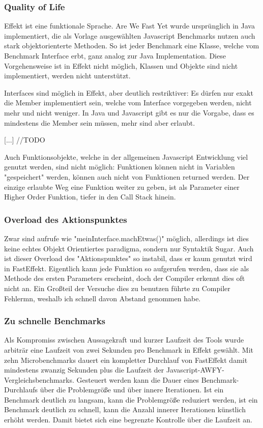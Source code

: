 
\subsubsection{ Quality of Life }
Effekt ist eine funktionale Sprache. Are We Fast Yet wurde ursprünglich in Java implementiert, die als Vorlage ausgewählten Javascript Benchmarks nutzen auch stark objektorienterte Methoden.
So ist jeder Benchmark eine Klasse, welche vom Benchmark Interface erbt, ganz analog zur Java Implementation.
Diese Vorgehensweise ist in Effekt nicht möglich, Klassen und Objekte sind nicht implementiert, werden nicht unterstützt.

Interfaces sind möglich in Effekt, aber deutlich restriktiver: Es dürfen nur exakt die Member implementiert sein, welche vom Interface vorgegeben werden, nicht mehr und nicht weniger.
In Java und Javascript gibt es nur die Vorgabe, dass es mindestens die Member sein müssen, mehr sind aber erlaubt.

[...] //TODO


Auch Funktionsobjekte, welche in der allgemeinen Javascript Entwicklung viel genutzt werden, sind nicht möglich: Funktionen können nicht in Variablen "gespeichert" werden, können auch nicht von Funktionen returned werden.
Der einzige erlaubte Weg eine Funktion weiter zu geben, ist als Parameter einer Higher Order Funktion, tiefer in den Call Stack hinein.

\subsubsection{ Overload des Aktionspunktes }
Zwar sind aufrufe wie "meinInterface.machEtwas()" möglich, allerdings ist dies keine echtes Objekt Orientiertes paradigma, sondern nur Syntaktik Sugar.
Auch ist dieser Overload des "Aktionspunktes" so instabil, dass er kaum genutzt wird in FastEffekt. Eigentlich kann jede Funktion so aufgerufen werden, dass sie als Methode des ersten Parameters erscheint, 
doch der Compiler erkennt dies oft nicht an. Ein Großteil der Versuche dies zu benutzen führte zu Compiler Fehlermn, weshalb ich schnell davon Abstand genommen habe.

\subsubsection{ Zu schnelle Benchmarks }
Als Kompromiss zwischen Aussagekraft und kurzer Laufzeit des Tools wurde arbiträr eine Laufzeit von zwei Sekunden pro Benchmark in Effekt gewählt.
Mit zehn Microbenchmarks dauert ein kompletter Durchlauf von FastEffekt damit mindestens zwanzig Sekunden plus die Laufzeit der Javascript-AWFY-Vergleichsbenchmarks.
Gesteuert werden kann die Dauer eines Benchmark-Durchlaufs über die Problemgröße und über innere Iterationen. Ist ein Benchmark deutlich zu langsam, kann die Problemgröße reduziert werden, ist ein Benchmark deutlich zu schnell, kann die Anzahl innerer Iterationen künstlich erhöht werden. Damit bietet sich eine begrenzte Kontrolle über die Laufzeit an.

